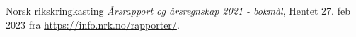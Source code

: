 {}
\begin{thebibliography}{99}
  Norsk rikskringkasting
  \emph{Årsrapport og årsregnskap 2021 - bokmål},
  Hentet 27. feb 2023 fra \url{https://info.nrk.no/rapporter/}.

  
\end{thebibliography}